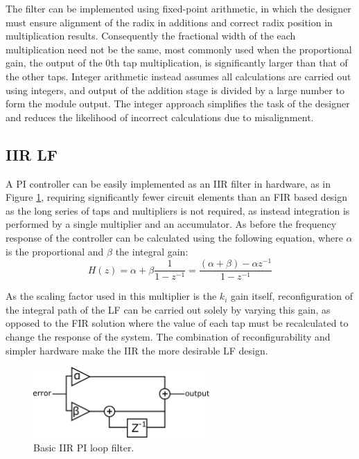 The filter can be implemented using fixed-point arithmetic, in which the designer must ensure alignment of the radix in additions and correct radix position in multiplication results. Consequently the fractional width of the each multiplication need not be the same, most commonly used when the proportional gain, the output of the 0th tap multiplication, is significantly larger than that of the other taps. Integer arithmetic instead assumes all calculations are carried out using integers, and output of the addition stage is divided by a large number to form the module output. The integer approach simplifies the task of the designer and reduces the likelihood of incorrect calculations due to misalignment.

\subsection{\ac{IIR} \acl{LF}}
A \ac{PI} controller can be easily implemented as an \ac{IIR} filter in hardware, as in Figure \ref{fig:iir_pi}, requiring significantly fewer circuit elements than an \ac{FIR} based design as the long series of taps and multipliers is not required, as instead integration is performed by a single multiplier and an accumulator. As before the frequency response of the controller can be calculated using the following equation, where $\alpha$ is the proportional and $\beta$ the integral gain:
\begin{equation*}
	H(z) = \alpha + \beta\frac{1}{1-z^{-1}} = \frac{(\alpha + \beta) - \alpha z^{-1}}{1-z^{-1}}
\end{equation*}

As the scaling factor used in this multiplier is the $k_i$ gain itself, reconfiguration of the integral path of the \acl{LF} can be carried out solely by varying this gain, as opposed to the \ac{FIR} solution where the value of each tap must be recalculated to change the response of the system. The combination of reconfigurability and simpler hardware make the \ac{IIR} the more desirable \ac{LF} design.
\begin{figure}[h]
	\centering
	\includegraphics[width=0.6\textwidth]{../simple_pi.pdf}
	\caption[Basic \ac{IIR} \ac{PI} loop filter]{Basic \ac{IIR} \ac{PI} loop filter.}
	\label{fig:iir_pi}
\end{figure}

